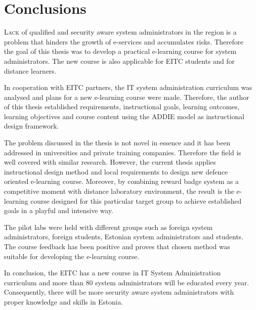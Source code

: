 \chapter{Conclusions}
\label{conclusion}
\lettrine[lraise=0.1, nindent=0em, slope=-.5em]{\color{Violet}L}{ack} of qualified and security aware system administrators in the region is a problem that hinders the growth of e-services and accumulates risks. Therefore the goal of this thesis was to develop a practical e-learning course for system administrators. The new course is also applicable for \gls{EITC} students and for distance learners. 

In cooperation with \gls{EITC} partners, the IT system administration curriculum was analysed and plans for a new e-learning course were made. Therefore, the author of this thesis established requirements, instructional goals, learning outcomes, learning objectives and course content using the \gls{ADDIE} model as instructional design framework.

The problem discussed in the thesis is not novel in essence and it has been addressed in universities and private training companies. Therefore the field is well covered with similar research. However, the current thesis applies instructional design method and local requirements to design new defence oriented e-learning course. Moreover, by combining reward badge system as a competitive moment with distance laboratory environment, the result is the e-learning course designed for this particular target group to achieve established goals in a playful and intensive way.

The pilot labs were held with different groups such as foreign system administrators, foreign students, Estonian system administrators and students. The course feedback has been positive and proves that chosen method was suitable for developing the e-learning course.


In conclusion, the \gls{EITC} has a new course in IT System Administration curriculum and more than 80 system administrators will be educated every year. Consequently,  there will be more security aware system administrators with proper knowledge and skills in Estonia.
